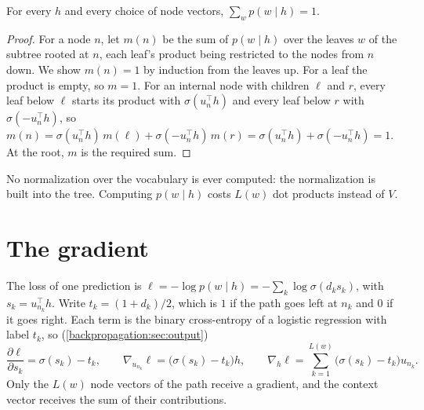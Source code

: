 \begin{notechapter}
\begin{proposition}[Normalization]\label{hierarchical-softmax:prop:normalized}
For every $h$ and every choice of node vectors, $\sum_{w}p(w\mid h) = 1$.
\end{proposition}

\begin{proof}
For a node $n$, let $m(n)$ be the sum of $p(w\mid h)$ over the leaves $w$ of the subtree rooted at $n$, each leaf's
product being restricted to the nodes from $n$ down. We show $m(n) = 1$ by induction from the
leaves up. For a leaf the product is empty, so $m = 1$. For an internal node with children $\ell$ and $r$,
every leaf below $\ell$ starts its product with $\sigma(u_n^\top h)$ and every leaf below $r$ with $\sigma(-u_n^\top h)$, so
$m(n) = \sigma(u_n^\top h)\,m(\ell) + \sigma(-u_n^\top h)\,m(r) = \sigma(u_n^\top h) + \sigma(-u_n^\top h) = 1$. At the root, $m$ is the required sum.
\end{proof}

No normalization over the vocabulary is ever computed: the normalization is built into the
tree. Computing $p(w\mid h)$ costs $L(w)$ dot products instead of $V$.

\section{The gradient}\label{hierarchical-softmax:sec:gradient}

The loss of one prediction is $\ell = -\log p(w\mid h) = -\sum_k\log\sigma(d_ks_k)$, with $s_k = u_{n_k}^\top h$. Write $t_k = (1 + d_k)/2$, which
is $1$ if the path goes left at $n_k$ and $0$ if it goes right. Each term is the binary cross-entropy of a logistic
regression with label $t_k$, so (\cref{backpropagation:sec:output})
\[
  \frac{\partial\ell}{\partial s_k} = \sigma(s_k) - t_k,\qquad
  \nabla_{u_{n_k}}\ell = \bigl(\sigma(s_k) - t_k\bigr)h,\qquad
  \nabla_h\ell = \sum_{k=1}^{L(w)}\bigl(\sigma(s_k) - t_k\bigr)u_{n_k} .
\]
Only the $L(w)$ node vectors of the path receive a gradient, and the context vector receives the
sum of their contributions.


\end{notechapter}
